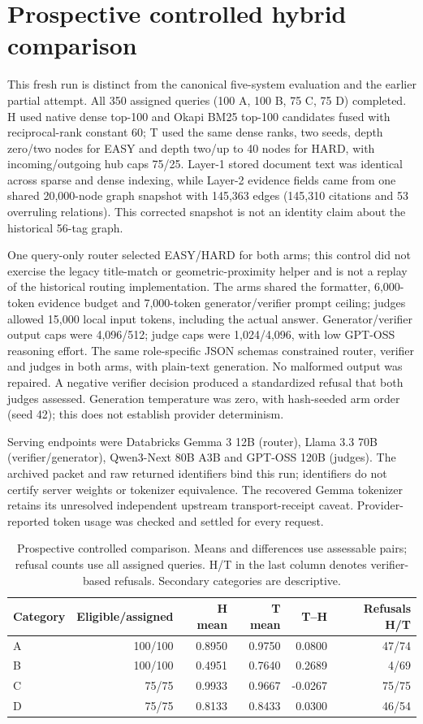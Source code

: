 \section{Prospective controlled hybrid comparison}
\label{supp:matched-comparison}
This fresh run is distinct from the canonical five-system evaluation and the earlier partial attempt. All 350 assigned queries (100 A, 100 B, 75 C, 75 D) completed. H used native dense top-100 and Okapi BM25 top-100 candidates fused with reciprocal-rank constant 60; T used the same dense ranks, two seeds, depth zero/two nodes for EASY and depth two/up to 40 nodes for HARD, with incoming/outgoing hub caps 75/25. Layer-1 stored document text was identical across sparse and dense indexing, while Layer-2 evidence fields came from one shared 20,000-node graph snapshot with 145,363 edges (145,310 citations and 53 overruling relations). This corrected snapshot is not an identity claim about the historical 56-tag graph.

One query-only router selected EASY/HARD for both arms; this control did not exercise the legacy title-match or geometric-proximity helper and is not a replay of the historical routing implementation. The arms shared the formatter, 6,000-token evidence budget and 7,000-token generator/verifier prompt ceiling; judges allowed 15,000 local input tokens, including the actual answer. Generator/verifier output caps were 4,096/512; judge caps were 1,024/4,096, with low GPT-OSS reasoning effort. The same role-specific JSON schemas constrained router, verifier and judges in both arms, with plain-text generation. No malformed output was repaired. A negative verifier decision produced a standardized refusal that both judges assessed. Generation temperature was zero, with hash-seeded arm order (seed 42); this does not establish provider determinism.

Serving endpoints were Databricks Gemma 3 12B (router), Llama 3.3 70B (verifier/generator), Qwen3-Next 80B A3B and GPT-OSS 120B (judges). The archived packet and raw returned identifiers bind this run; identifiers do not certify server weights or tokenizer equivalence. The recovered Gemma tokenizer retains its unresolved independent upstream transport-receipt caveat. Provider-reported token usage was checked and settled for every request.

\begin{table}[htbp]\centering\small
\caption{Prospective controlled comparison. Means and differences use assessable pairs; refusal counts use all assigned queries. H/T in the last column denotes verifier-based refusals. Secondary categories are descriptive.}
\begin{tabular}{lrrrrr}\toprule Category & Eligible/assigned & H mean & T mean & T--H & Refusals H/T \\
\midrule
A & 100/100 & 0.8950 & 0.9750 & 0.0800 & 47/74 \\
B & 100/100 & 0.4951 & 0.7640 & 0.2689 & 4/69 \\
C & 75/75 & 0.9933 & 0.9667 & -0.0267 & 75/75 \\
D & 75/75 & 0.8133 & 0.8433 & 0.0300 & 46/54 \\
\bottomrule\end{tabular}\end{table}

